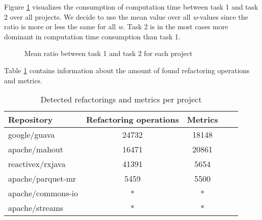 Figure \ref{fig:taskratio} visualizes the consumption of computation time between task 1 and task 2 over all projects. We decide to use the mean value over all \emph{w}-values since the ratio is more or less the same for all \emph{w}. Task 2 is in the most cases more dominant in computation time consumption than task 1.

\begin{figure}
    \centering
    \caption{Mean ratio between task 1 and task 2 for each project}
    \label{fig:taskratio}
\end{figure}

Table \ref{tab:detectedrefandmetrics} contains information about the amount of found refactoring operations and metrics. 

\begin{table}[htbp]
\caption{Detected refactorings and metrics per project}
\label{tab:detectedrefandmetrics}
\begin{center}
\begin{tabular}{|l|c|c|c|c|}
\hline
\textbf{Repository}&\textbf{Refactoring operations}&\textbf{Metrics}\\
\hline
google/guava& 24732 & 18148\\
\hline
apache/mahout& 16471 & 20861\\
\hline
reactivex/rxjava& 41391 & 5654\\
\hline
apache/parquet-mr & 5459 & 5500\\
\hline
apache/commons-io & * & *\\
\hline
apache/streams & * & *\\
\hline
\end{tabular}
\end{center}
\end{table}

